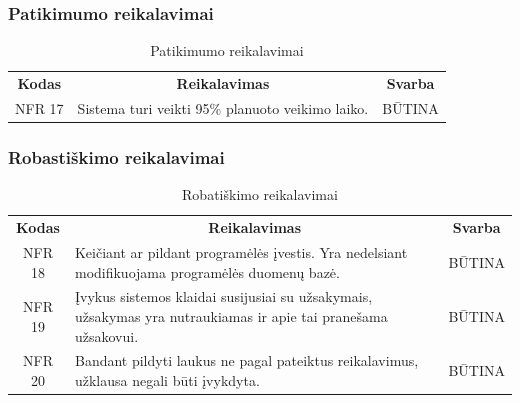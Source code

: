 \documentclass{VUMIFPSkursinis}
\begin{document}
\subsubsection{Patikimumo reikalavimai}

\begin{center}
	\begin{table}[H]
	\caption{Patikimumo reikalavimai}
	\begin{tabular}{|p{2cm}|p{}|p{}|}
	\hline
	    \rowcolor{lightgray}
		\multicolumn{3}{|c|}{Patikimumo reikalavimai}\\
		
	\hline
		\multicolumn{1}{|c|}{{\bfseries Kodas}}&
		\multicolumn{1}{|c|}{{\bfseries Reikalavimas}}&
		\multicolumn{1}{|c|}{{\bfseries Svarba}}\\
	\hline 	
		\multicolumn{1}{|c|}{NFR 17}&
		{Sistema turi veikti 95\% planuoto veikimo laiko. }&
		\multicolumn{1}{|c|}{BŪTINA}\\	
	\hline 	 	 	
	\end{tabular}
	
	\label{table:Patikimumoreikalavimai}
	\end{table}

\end{center}



\subsubsection{Robastiškimo reikalavimai}

\begin{center}
	\begin{table}[H]
	\caption{Robatiškimo reikalavimai}
	\begin{tabular}{|p{2cm}|p{}|p{}|}
	\hline
	    \rowcolor{lightgray}
		\multicolumn{3}{|c|}{Robastiškumo reikalavimai}\\
		
	\hline
		\multicolumn{1}{|c|}{{\bfseries Kodas}}&
		\multicolumn{1}{|c|}{{\bfseries Reikalavimas}}&
		\multicolumn{1}{|c|}{{\bfseries Svarba}}\\
	\hline 	
		\multicolumn{1}{|c|}{NFR 18}&
		{Keičiant ar pildant programėlės įvestis. Yra nedelsiant modifikuojama programėlės duomenų bazė.}&
		\multicolumn{1}{|c|}{BŪTINA}\\
		
	\hline 	
		\multicolumn{1}{|c|}{NFR 19}&
		{Įvykus sistemos klaidai susijusiai su užsakymais, užsakymas yra nutraukiamas ir apie tai pranešama užsakovui.}&
		\multicolumn{1}{|c|}{BŪTINA}\\
		
	\hline 	
		\multicolumn{1}{|c|}{NFR 20}&
		{Bandant pildyti laukus ne pagal pateiktus reikalavimus, užklausa negali būti įvykdyta.}&
		\multicolumn{1}{|c|}{BŪTINA}\\
		
	\hline
	
	
	\end{tabular}
	
	\label{table:Robastiškumoreikalavimai}
	\end{table}

\end{center}
\end{document}
